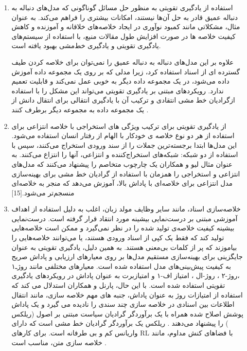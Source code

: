 \begin{enumerate}
	\item{		
		استفاده از یادگیری تقویتی به منظور حل مسائل گوناگونی که مدل‌های دنباله به دنباله عمیق قادر به حل آن‌ها نیستند، امکانات بیشتری را فراهم می‌کند. به عنوان مثال، مشکلاتی مانند کمبود نوآوری در ایجاد خلاصه‌های خلاقانه و آموزنده و کاهش کیفیت خلاصه ها در صورت افزایش طول مقالات منبع، با استفاده از سیستم‌های یادگیری تقویتی و یادگیری خط‌مشی
		 بهبود یافته است.

 علاوه بر این  مدل‌های دنباله به دنباله عمیق را نمی‌توان برای خلاصه کردن طیف گسترده ای از اسناد استفاده کرد، زیرا مدلی که بر روی یک مجموعه داده آموزش داده می‌شود، در یک مجموعه داده دیگر به خوبی عمل نمی‌کند و قابلیت تعمیم ندارد. رویکردهای مبتنی بر یادگیری تقویتی می‌تواند این  مشکل را با استفاده ازگرادیان خط مشی انتقادی
  و ترکیب آن با یادگیری انتقالی
برای انتقال دانش از یک مجموعه داده به مجموعه دیگر برطرف کنند
\cite{DeepTL_RL}.}
 \item{
  از یادگیری تقویتی برای ترکیب ویژگی های استخراجی با خلاصه انتزاعی برای استفاده از هر دو نوع خلاصه ی خودکار با الهام از رفتار انسان استفاده می‌شود. این مدل‌ها ابتدا برجسته‌ترین جملات را از سند ورودی استخراج می‌کنند، سپس با استفاده از دو شبکه: شبکه‌های استخراج‌کننده و انتزاعی، آنها را انتزاع می‌کنند. به عنوان مثال لیو و همکاران یک چارچوب متخاصم را پیشنهاد می‌کنند که مدل‌های انتزاعی و استخراجی را همزمان با استفاده از گرادیان خط ‌مشی برای بهینه‌سازی مدل انتزاعی برای خلاصه‌ای با پاداش بالا، آموزش می‌دهد که منجر به خلاصه‌ای منسجم‌تر می‌شود.[15]
}
\item{  
	
	خلاصه‌سازی اسناد، مانند سایر وظایف مولد زبان،  اغلب به دلیل استفاده از اهداف آموزشی مبتنی بر  درست‌نمایی بیشینه
	 مورد انتقاد قرار گرفته است.
	درست‌نمایی بیشینه کیفیت خلاصه‌ی تولید شده را در نظر نمی‌گیرد و ممکن است خلاصه‌هایی تولید کند که فقط یک کپی از اسناد ورودی هستند، یا می‌توانند خلاصه‌هایی را بیاموزند که پر از کلمات بی‌معنی هستند. به همین دلیل، یادگیری تقویتی به عنوان جایگزینی برای بهینه‌سازی مستقیم مدل‌ها بر روی معیارهای ارزیابی و پاداش صریح به کیفیت پیش‌بینی‌های مدل استفاده شده است. 
	معیارهای مختلفی مانند روژـ۱
،روژ-۲
،
روژ-‌ال
،
امتیاز اف-۱
	و امتیازبرت
	 به عنوان پاداش در رویکردهای یادگیری تقویتی استفاده شده است. با این حال، پارنل و همکاران  استدلال می کند که استفاده از امتیازات روژ به عنوان پاداش، جنبه های مهم خلاصه سازی، مانند انتقال اطلاعات بین اسنادی در خلاصه سازی چند سندی را نادیده می گیرد و یک پاداش پوشش اصلاح شده همراه با یک برآوردگر گرادیان سیاست مبتنی بر اصول (ریلکس )
	  را پیشنهاد می‌دهند
	  \cite{Parnell2022AMC}.
	   ریلکس یک برآوردگر گرادیان خط مشی است که دارای واریانس کم و بی طرفانه است. برای کارهای RL با فضاهای کنش مداوم، مانند خلاصه سازی متن، مناسب است
	   \cite{Grathwohl2017BackpropagationTT}.

}
\end{enumerate}
